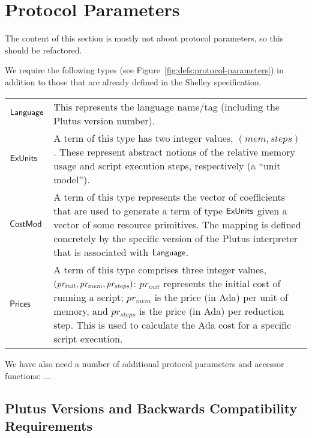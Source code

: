 \section{Protocol Parameters}
\label{sec:protocol-parameters}

\begin{note}
  The content of this section is mostly not about protocol parameters, so this should be refactored.
\end{note}

We require the following types (see Figure~\ref{fig:defs:protocol-parameters})
in addition to those that are already defined in the Shelley specification.

\vspace{12pt}
\begin{tabular}{lp{5in}}
  $\mathsf{Language}$ &
  This represents the language name/tag (including the Plutus
  version number).
  \\
  $\mathsf{ExUnits}$ &
  A term of this type has two integer values,
  $(mem, steps)$.
  These represent abstract notions of the relative memory usage and script execution steps,
  respectively (a ``unit model'').
  \\
  $\mathsf{CostMod}$ &
  A term of this type represents the vector of coefficients that are used to generate
  a term of type $\mathsf{ExUnits}$ given a vector of some resource primitives.  The mapping is defined
  concretely by the specific version of the Plutus interpreter that is associated with $\mathsf{Language}$.
  \\
  $\mathsf{Prices}$ &
  A term of this type comprises three integer values,
  $\mathit{(pr_{init}, pr_{mem}, pr_{steps})}$: $pr_{init}$ represents the initial
  cost of running a script; $pr_{mem}$ is the price (in Ada) per unit of memory, and $pr_{steps}$ is the price (in Ada) per
  reduction step. This is used to calculate the Ada cost for a specific script execution.
\end{tabular}
\vspace{12pt}

We have also need a number of additional protocol parameters and accessor functions: ...

\subsection{Plutus Versions and Backwards Compatibility Requirements}
\label{sec:versions}

